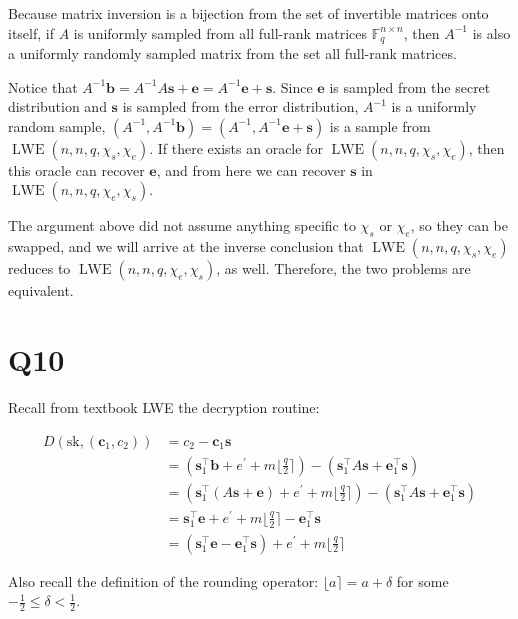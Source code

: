 \documentclass{article}
\newcommand{\round}[1]{\lfloor {#1} \rceil}
\begin{document}
Because matrix inversion is a bijection from the set of invertible matrices onto itself, if $A$ is uniformly sampled from all full-rank matrices $\mathbb{F}_q^{n \times n}$, then $A^{-1}$ is also a uniformly randomly sampled matrix from the set all full-rank matrices.

Notice that $A^{-1}\mathbf{b} = A^{-1}A\mathbf{s} + \mathbf{e} = A^{-1}\mathbf{e} + \mathbf{s}$. Since $\mathbf{e}$ is sampled from the secret distribution and $\mathbf{s}$ is sampled from the error distribution, $A^{-1}$ is a uniformly random sample, $(A^{-1}, A^{-1}\mathbf{b}) = (A^{-1}, A^{-1}\mathbf{e} + \mathbf{s})$ is a sample from $\operatorname{LWE}(n, n, q, \chi_s, \chi_e)$. If there exists an oracle for $\operatorname{LWE}(n, n, q, \chi_s, \chi_e)$, then this oracle can recover $\mathbf{e}$, and from here we can recover $\mathbf{s}$ in $\operatorname{LWE}(n, n, q, \chi_e, \chi_s)$.

The argument above did not assume anything specific to $\chi_s$ or $\chi_e$, so they can be swapped, and we will arrive at the inverse conclusion that $\operatorname{LWE}(n, n, q, \chi_s, \chi_e)$ reduces to $\operatorname{LWE}(n, n, q, \chi_e, \chi_s)$, as well. Therefore, the two problems are equivalent.

\newpage

\section*{Q10}
Recall from textbook LWE the decryption routine:

$$
\begin{aligned}
D(\text{sk}, (\mathbf{c}_1, c_2))
&= c_2 - \mathbf{c}_1\mathbf{s} \\
&= (\mathbf{s}_1^\intercal\mathbf{b} + e^\prime + m\round{\frac{q}{2}}) 
    - (\mathbf{s}_1^\intercal A\mathbf{s} + \mathbf{e}_1^\intercal\mathbf{s}) \\
&= (\mathbf{s}_1^\intercal(A\mathbf{s} + \mathbf{e}) + e^\prime + m\round{\frac{q}{2}}) 
    - (\mathbf{s}_1^\intercal A\mathbf{s} + \mathbf{e}_1^\intercal\mathbf{s}) \\
&= \mathbf{s}_1^\intercal\mathbf{e} + e^\prime + m\round{\frac{q}{2}} - \mathbf{e}_1^\intercal\mathbf{s} \\
&= (\mathbf{s}_1^\intercal\mathbf{e} - \mathbf{e}_1^\intercal\mathbf{s}) + e^\prime + m\round{\frac{q}{2}}
\end{aligned}
$$

Also recall the definition of the rounding operator: $\round{a} = a + \delta$ for some $-\frac{1}{2} \leq \delta < \frac{1}{2}$.
\end{document}
